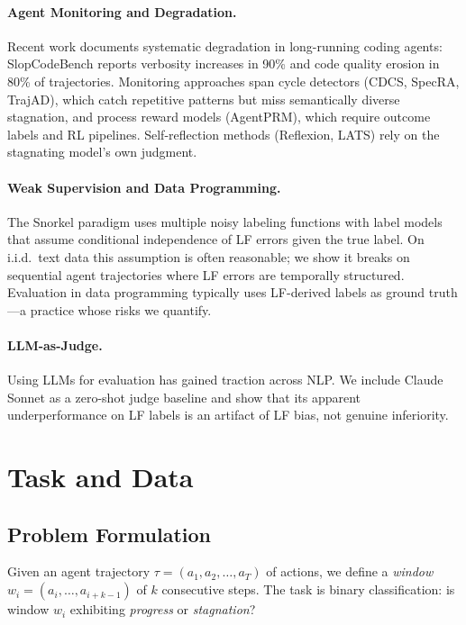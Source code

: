 \documentclass[11pt,a4paper]{article}
\begin{document}
\paragraph{Agent Monitoring and Degradation.}
Recent work documents systematic degradation in long-running coding agents: SlopCodeBench reports verbosity increases in 90\% and code quality erosion in 80\% of trajectories.
Monitoring approaches span cycle detectors (CDCS, SpecRA, TrajAD), which catch repetitive patterns but miss semantically diverse stagnation, and process reward models (AgentPRM), which require outcome labels and RL pipelines.
Self-reflection methods (Reflexion, LATS) rely on the stagnating model's own judgment.

\paragraph{Weak Supervision and Data Programming.}
The Snorkel paradigm uses multiple noisy labeling functions with label models that assume conditional independence of LF errors given the true label.
On i.i.d.\ text data this assumption is often reasonable; we show it breaks on sequential agent trajectories where LF errors are temporally structured.
Evaluation in data programming typically uses LF-derived labels as ground truth---a practice whose risks we quantify.

\paragraph{LLM-as-Judge.}
Using LLMs for evaluation has gained traction across NLP.
We include Claude Sonnet as a zero-shot judge baseline and show that its apparent underperformance on LF labels is an artifact of LF bias, not genuine inferiority.

\section{Task and Data}
\label{sec:task}

\subsection{Problem Formulation}

Given an agent trajectory $\tau = (a_1, a_2, \ldots, a_T)$ of actions, we define a \emph{window} $w_i = (a_i, \ldots, a_{i+k-1})$ of $k$ consecutive steps.
The task is binary classification: is window $w_i$ exhibiting \emph{progress} or \emph{stagnation}?
\end{document}
